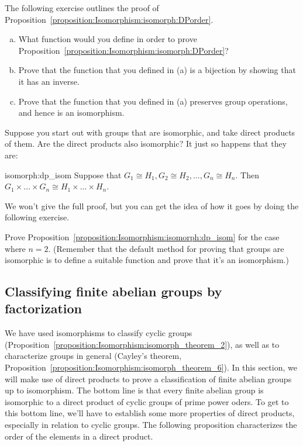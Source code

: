 The following exercise outlines the proof of Proposition~\ref{proposition:Isomorphism:isomorph:DPorder}.

\begin{exercise}{}
\begin{enumerate}[(a)]
\item
What function would you define in order to prove Proposition~\ref{proposition:Isomorphism:isomorph:DPorder}?
\item
Prove that the function that you defined in (a) is a bijection by showing that it has an inverse.
\item
Prove that the function that you defined in (a) preserves group operations, and hence is an isomorphism.
\end{enumerate}
\end{exercise}

Suppose you start out with groups that are isomorphic, and take direct products of them.  Are the direct products also isomorphic? It just so happens that they are:

\begin{prop}{isomorph:dp_isom}
Suppose that $G_1 \cong H_1, G_2 \cong H_2, \ldots, G_n \cong H_n$. Then $G_1 \times \ldots \times G_n  \cong H_1 \times \ldots \times H_n$.
\end{prop}

\noindent
We won't give the full proof, but you can get the idea of how it goes by doing the following exercise.

\begin{exercise}{}
Prove Proposition~\ref{proposition:Isomorphism:isomorph:dp_isom} for the case where $n=2$. (Remember that the default method for proving that groups are isomorphic is to define a suitable function and prove that it's an isomorphism.)
\end{exercise}

\subsection{Classifying finite abelian groups by factorization}

We have used isomorphisms to classify cyclic groups (Proposition~\ref{proposition:Isomorphism:isomorph_theorem_2}), as well as to characterize  groups in general (Cayley's theorem, Proposition~\ref{proposition:Isomorphism:isomorph_theorem_6}). In this section, we will make use of direct products to prove a classification of finite abelian groups up to isomorphism. The bottom line is that every finite abelian group is isomorphic to a direct product of cyclic groups of prime power oders. To get to this bottom line, we'll have to establish some more properties of direct products, especially in relation to cyclic groups.  The following  proposition characterizes the order of the elements in a direct product.

